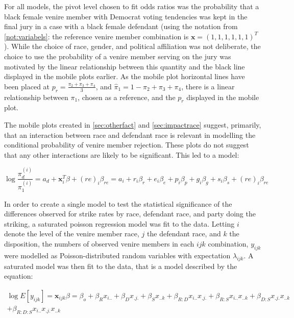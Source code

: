 For all models, the pivot level chosen to fit odds ratios was the probability that a black female venire member with Democrat
voting tendencies was kept in the final jury in a case with a black female defendant (using the notation from \ref{not:variabels}:
the reference venire member combination is $\mathbf{x} = (1,1,1,1,1,1)^T$). While the choice of race, gender, and political
affiliation was not deliberate, the choice to use the probability of a venire member serving on the jury was motivated by the
linear relationship between this quantity and the black line displayed in the mobile plots earlier. As the mobile plot horizontal
lines have been placed at $p_r = \frac{\pi_2 + \pi_3 + \pi_4}{3}$, and $\hat{\pi}_1 = 1 - \pi_2 + \pi_3 + \pi_4$, there is a
linear relationship between $\pi_1$, chosen as a reference, and the $p_r$ displayed in the mobile plot.

The mobile plots created in \ref{sec:otherfact} and \ref{sec:impactrace} suggest, primarily, that an interaction between race and
defendant race is relevant in modelling the conditional probability of venire member rejection. These plots do not suggest that
any other interactions are likely to be significant. This led to a model:

\begin{equation}
  \log \frac{\pi_d^{(i)}}{\pi_1^{(i)}} = a_d + \mathbf{x}_i^T \beta + (re)_i \beta_{re}= a_i + r_i \beta_r + e_i \beta_e + p_i
  \beta_p + g_i \beta_g + s_i \beta_s + (re)_i \beta_{re}
\end{equation}

In order to create a single model to test the statistical significance of the differences observed for strike rates by race,
defendant race, and party doing the striking, a saturated poisson regression model was fit to the data. Letting $i$ denote the
level of the venire member race, $j$ the defendant race, and $k$ the disposition, the numbers of observed venire members in each
$ijk$ combination, $y_{ijk}$ were modelled as Poisson-distributed random variables with expectation $\lambda_{ijk}$. A saturated
model was then fit to the data, that is a model described by the equation:

\begin{multline}
  \log{E[y_{ijk}]} = \textbf{x}_{ijk}\beta = \beta_o + \beta_R x_{i..}  + \beta_{D} x_{.j.} + \beta_S x_{..k} +\beta_{R:D}x_{i..}
  x_{.j.} + \beta_{R:S} x_{i..} x_{..k} +\beta_{D:S} x_{.j.}x_{..k} \\+ \beta_{R:D:S} x_{i..} x_{.j.} x_{..k}
\end{multline}

